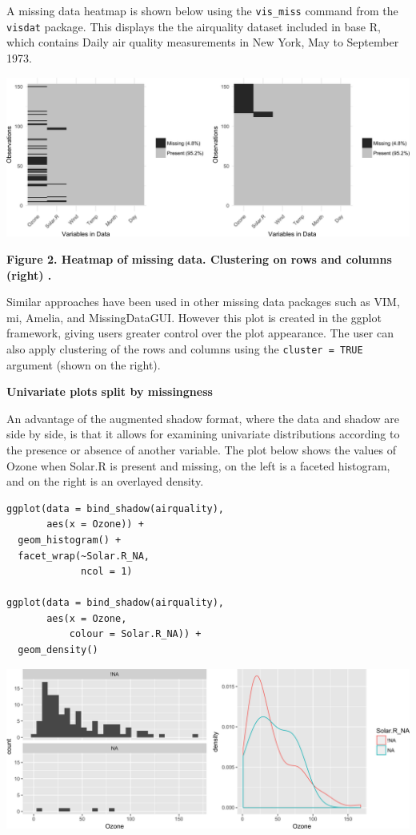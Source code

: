 \documentclass[]{article}
\begin{document}
A missing data heatmap is shown below using the \texttt{vis\_miss}
command from the \texttt{visdat} package. This displays the the
airquality dataset included in base R, which contains Daily air quality
measurements in New York, May to September 1973.

\includegraphics{jsm2017_njtierney_files/figure-latex/unnamed-chunk-1-1.png}

\textbf{Figure 2. Heatmap of missing data. Clustering on rows and
columns (right) .}

Similar approaches have been used in other missing data packages such as
VIM, mi, Amelia, and MissingDataGUI. However this plot is created in the
ggplot framework, giving users greater control over the plot appearance.
The user can also apply clustering of the rows and columns using the
\texttt{cluster\ =\ TRUE} argument (shown on the right).

\textbf{Univariate plots split by missingness}

An advantage of the augmented shadow format, where the data and shadow
are side by side, is that it allows for examining univariate
distributions according to the presence or absence of another variable.
The plot below shows the values of Ozone when Solar.R is present and
missing, on the left is a faceted histogram, and on the right is an
overlayed density.

\begin{verbatim}
ggplot(data = bind_shadow(airquality),
       aes(x = Ozone)) + 
  geom_histogram() + 
  facet_wrap(~Solar.R_NA,
             ncol = 1)

ggplot(data = bind_shadow(airquality),
       aes(x = Ozone,
           colour = Solar.R_NA)) + 
  geom_density()
\end{verbatim}

\includegraphics{jsm2017_njtierney_files/figure-latex/bind-shadow-density-1.png}
\end{document}
